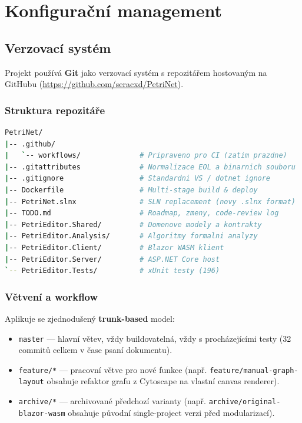 \documentclass[12pt,a4paper]{article}
\begin{document}
\section{Konfigurační management}
\label{sec:cm}

\subsection{Verzovací systém}

Projekt používá \textbf{Git} jako verzovací systém s repozitářem
hostovaným na GitHubu (\url{https://github.com/seracxd/PetriNet}).

\subsubsection{Struktura repozitáře}

\begin{lstlisting}[language=bash]
PetriNet/
|-- .github/
|   `-- workflows/              # Pripraveno pro CI (zatim prazdne)
|-- .gitattributes              # Normalizace EOL a binarnich souboru
|-- .gitignore                  # Standardni VS / dotnet ignore
|-- Dockerfile                  # Multi-stage build & deploy
|-- PetriNet.slnx               # SLN replacement (novy .slnx format)
|-- TODO.md                     # Roadmap, zmeny, code-review log
|-- PetriEditor.Shared/         # Domenove modely a kontrakty
|-- PetriEditor.Analysis/       # Algoritmy formalni analyzy
|-- PetriEditor.Client/         # Blazor WASM klient
|-- PetriEditor.Server/         # ASP.NET Core host
`-- PetriEditor.Tests/          # xUnit testy (196)
\end{lstlisting}

\subsubsection{Větvení a workflow}

Aplikuje se zjednodušený \textbf{trunk-based} model:

\begin{itemize}
    \item \texttt{master} — hlavní větev, vždy buildovatelná, vždy
          s procházejícími testy (32 commitů celkem v čase psaní dokumentu).
    \item \texttt{feature/*} — pracovní větve pro nové funkce
          (např. \texttt{feature/manual-graph-layout} obsahuje refaktor
          grafu z Cytoscape na vlastní canvas renderer).
    \item \texttt{archive/*} — archivované předchozí varianty (např.
          \texttt{archive/original-blazor-wasm} obsahuje původní
          single-project verzi před modularizací).
\end{itemize}
\end{document}
